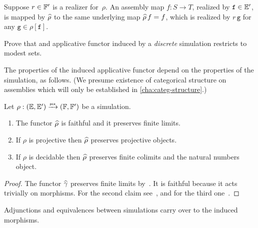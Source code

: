 Suppose $r \in {\mathbb{F}'}$ is a realizer for~$\rho$. An assembly map $f: S \to T$, realized by $\mathtt{f} \in {\mathbb{E}'}$, is mapped by $\widehat{\rho}$ to the same underlying map $\widehat{\rho}\,f = f$, which is realized by $r \, \mathtt{g}$ for any $\mathtt{g} \in \rho[\mathtt{f}]$.

\begin{exercise}
  Prove that and applicative functor induced by a \emph{discrete} simulation restricts to modest sets.
\end{exercise}

The properties of the induced applicative functor depend on the properties of the simulation, as follows. (We presume existence of categorical structure on assemblies which will only be established in \cref{cha:categ-structure}.)

\begin{proposition}
  \label{th:applicative_functor_properties}%
  Let $\rho: ({\mathbb{E}}, {\mathbb{E}'}) \xrightarrow{\scriptscriptstyle\mathsf{pca}}{} ({\mathbb{F}}, {\mathbb{F}'})$ be a simulation.
  \begin{enumerate}
  \item
    The functor $\widehat{\rho}$ is faithful  and it preserves finite limits.
  \item
    If $\rho$ is projective then $\widehat{\rho}$ preserves projective objects.
  \item
    If $\rho$ is decidable then $\widehat{\rho}$ preserves finite colimits and the natural numbers object.
  \end{enumerate}
\end{proposition}

\begin{proof}
  The functor $\widehat{\gamma}$ preserves finite limits
  by~\cite[Proposition~2.2.2]{Longley:94}. It is faithful
  because it acts trivially on morphisms.
  For the second claim see~\cite[Theorem~2.4.12]{Longley:94}, and for the third one~\cite[Theorem~2.4.19]{Longley:94}.
\end{proof}

Adjunctions and equivalences between simulations carry over to the induced morphisms.

